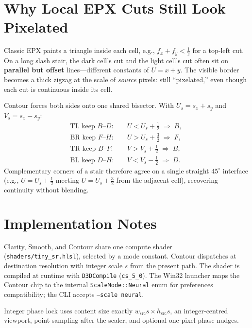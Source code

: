 \documentclass[conference]{IEEEtran}
\begin{document}
\section{Why Local EPX Cuts Still Look Pixelated}
\label{sec:epx}

Classic EPX paints a triangle inside each cell, e.g.,
$f_x+f_y < \tfrac12$ for a top-left cut. On a long slash stair, the dark
cell's cut and the light cell's cut often sit on \textbf{parallel but offset}
lines---different constants of $U=x+y$. The visible border becomes a thick
zigzag at the scale of \emph{source} pixels: still ``pixelated,'' even though
each cut is continuous inside its cell.

Contour forces both sides onto one shared bisector. With
$U_s = s_x+s_y$ and $V_s = s_x-s_y$:
\begin{align}
  \text{TL keep }B\text{--}D:&\quad
    U < U_s + \tfrac12 \;\Rightarrow\; B,\\
  \text{BR keep }F\text{--}H:&\quad
    U > U_s + \tfrac32 \;\Rightarrow\; F,\\
  \text{TR keep }B\text{--}F:&\quad
    V > V_s + \tfrac12 \;\Rightarrow\; B,\\
  \text{BL keep }D\text{--}H:&\quad
    V < V_s - \tfrac12 \;\Rightarrow\; D.
\end{align}
Complementary corners of a stair therefore agree on a single straight
$45^\circ$ interface (e.g., $U = U_s+\tfrac12$ meeting
$U = U_s+\tfrac32$ from the adjacent cell), recovering continuity without
blending.

\section{Implementation Notes}
\label{sec:impl}

Clarity, Smooth, and Contour share one compute shader
(\texttt{shaders/tiny\_sr.hlsl}), selected by a mode constant. Contour
dispatches at destination resolution with integer scale $s$ from the present
path. The shader is compiled at runtime with \texttt{D3DCompile}
(\texttt{cs\_5\_0}). The Win32 launcher maps the Contour chip to the internal
\texttt{ScaleMode::Neural} enum for preferences compatibility; the CLI accepts
\texttt{--scale neural}.

Integer phase lock uses content size exactly
$w_{\mathrm{src}}s \times h_{\mathrm{src}}s$, an integer-centred viewport,
point sampling after the scaler, and optional one-pixel phase nudges.
\end{document}
